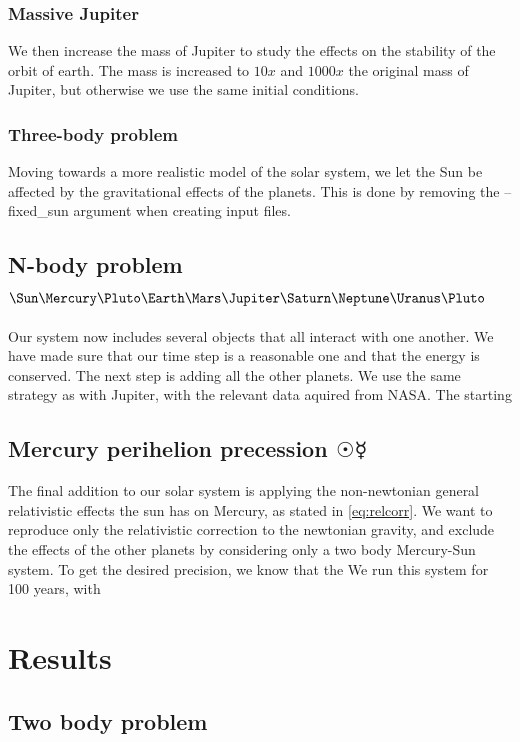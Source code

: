 \documentclass[10pt]{article}
\begin{document}
\begin{multicols}{2}
\subsubsection{Massive Jupiter }
We then increase the mass of Jupiter to study the effects on the stability
of the orbit of earth. The mass is increased to $10x$ and $1000x$ the
original mass of Jupiter, but otherwise we use the same initial conditions.

\subsubsection{Three-body problem} 
Moving towards a more realistic model of the solar system, we let the Sun
be affected by the gravitational effects of the planets. This is done by
removing the --fixed\_sun argument when creating input files.

\subsection{N-body problem \texorpdfstring{$\Sun\Mercury\Pluto\Earth\Mars\Jupiter\Saturn\Neptune\Uranus\Pluto$}{}} 
Our system now includes several objects that all interact with one another.
We have made sure that our time step is a reasonable one and that the
energy is conserved. The next step is adding all the other planets. We use
the same strategy as with Jupiter, with the relevant data aquired from
NASA. The starting

\subsection{Mercury perihelion precession \texorpdfstring{$\Sun\Mercury$}{}} 
The final addition to our solar system is applying the non-newtonian
general relativistic effects the sun has on Mercury, as stated in
\cref{eq:relcorr}. We want to reproduce only the relativistic correction to
the newtonian gravity, and exclude the effects of the other planets by
considering only a two body Mercury-Sun system. To get the desired
precision, we know that the We run this system for 100
years, with


\section{Results}
\subsection{Two body problem}

\end{multicols}
\end{document}
